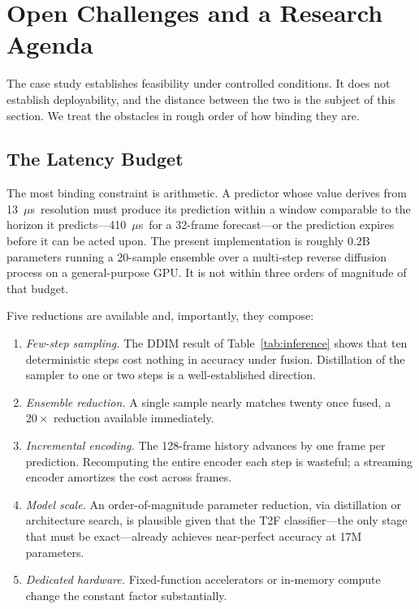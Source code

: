 \documentclass[lettersize,journal]{IEEEtran}
\newcommand{\us}{\ensuremath{\mu}s}
\begin{document}
\section{\textbf{Open Challenges and a Research Agenda}}

The case study establishes feasibility under controlled conditions. It
does not establish deployability, and the distance between the two is the
subject of this section. We treat the obstacles in rough order of how
binding they are.

\subsection{\textbf{The Latency Budget}}
The most binding constraint is arithmetic. A predictor whose value
derives from 13~\us\ resolution must produce its prediction within a
window comparable to the horizon it predicts---410~\us\ for a 32-frame
forecast---or the prediction expires before it can be acted upon. The
present implementation is roughly 0.2B parameters running a 20-sample
ensemble over a multi-step reverse diffusion process on a
general-purpose GPU. It is not within three orders of magnitude of that
budget.

Five reductions are available and, importantly, they compose:

\begin{enumerate}
\item \emph{Few-step sampling.} The DDIM result of
Table~\ref{tab:inference} shows that ten deterministic steps cost
nothing in accuracy under fusion. Distillation of the sampler to one or
two steps is a well-established direction.
\item \emph{Ensemble reduction.} A single sample nearly matches twenty
once fused, a $20\times$ reduction available immediately.
\item \emph{Incremental encoding.} The 128-frame history advances by one
frame per prediction. Recomputing the entire encoder each step is
wasteful; a streaming encoder amortizes the cost across frames.
\item \emph{Model scale.} An order-of-magnitude parameter reduction, via
distillation \cite{Hinton2015,Cheng2023} or architecture search, is
plausible given that the T2F classifier---the only stage that must be
exact---already achieves near-perfect accuracy at 17M parameters.
\item \emph{Dedicated hardware.} Fixed-function accelerators or
in-memory compute change the constant factor substantially.
\end{enumerate}
\end{document}
